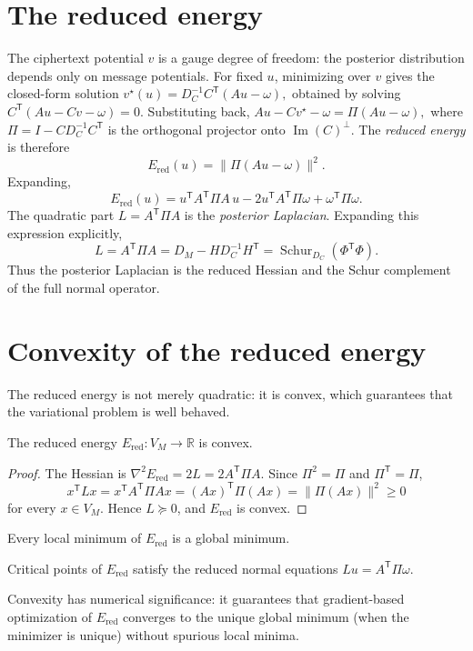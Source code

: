 \section{The reduced energy}\label{ch:sec:the-reduced-energy}
The ciphertext potential $v$ is a gauge degree of freedom: the posterior distribution depends only on message potentials.  For fixed $u$, minimizing over $v$ gives the closed-form solution
$v^\star(u)=D_C^{-1}C^{\mathsf T}(Au-\omega),$
obtained by solving $C^{\mathsf T}(Au-Cv-\omega)=0$.  Substituting back,
$Au-Cv^\star-\omega = \Pi(Au-\omega),$
where $\Pi=I-C D_C^{-1}C^{\mathsf T}$ is the orthogonal projector onto $\operatorname{Im}(C)^\perp$.
The \emph{reduced energy} is therefore
\begin{equation}\label{ch:eq:ered}
E_{\mathrm{red}}(u)=\|\Pi(Au-\omega)\|^2.
\end{equation}
Expanding,
\begin{equation}\label{ch:eq:ered-expanded}
E_{\mathrm{red}}(u)=u^{\mathsf T}A^{\mathsf T}\Pi A\,u
-2u^{\mathsf T}A^{\mathsf T}\Pi\omega
+\omega^{\mathsf T}\Pi\omega.
\end{equation}
The quadratic part $L=A^{\mathsf T}\Pi A$ is the \emph{posterior Laplacian}.  Expanding this expression explicitly,
\[
L = A^{\mathsf T}\Pi A = D_M - H D_C^{-1} H^{\mathsf T}
= \operatorname{Schur}_{D_C}(\Phi^{\mathsf T}\Phi).
\]
Thus the posterior Laplacian is the reduced Hessian and the Schur complement~\cite{zhang2005schur} of the full normal operator.
\section{Convexity of the reduced energy}\label{ch:sec:convexity-of-the-reduced-energy}
The reduced energy is not merely quadratic: it is convex, which guarantees that the variational problem is well behaved.
\begin{theorem}[Convexity]\label{ch:thm:convexity}
The reduced energy $E_{\mathrm{red}}:V_M\to\mathbb R$ is convex.
\end{theorem}
\begin{proof}
The Hessian is $\nabla^2 E_{\mathrm{red}}=2L=2A^{\mathsf T}\Pi A$.
Since $\Pi^2=\Pi$ and $\Pi^{\mathsf T}=\Pi$,
\[
x^{\mathsf T}Lx = x^{\mathsf T}A^{\mathsf T}\Pi Ax = (Ax)^{\mathsf T}\Pi(Ax)
= \|\Pi(Ax)\|^2 \ge 0
\]
for every $x\in V_M$.  Hence $L\succeq 0$, and $E_{\mathrm{red}}$ is convex.
\end{proof}

\begin{corollary}\label{ch:cor:global-min}
Every local minimum of $E_{\mathrm{red}}$ is a global minimum.
\end{corollary}
\begin{corollary}\label{ch:cor:critical-points}
Critical points of $E_{\mathrm{red}}$ satisfy the reduced normal equations
$L u = A^{\mathsf T}\Pi\omega$.
\end{corollary}
Convexity has numerical significance: it guarantees that gradient-based optimization of $E_{\mathrm{red}}$ converges to the unique global minimum (when the minimizer is unique) without spurious local minima.
